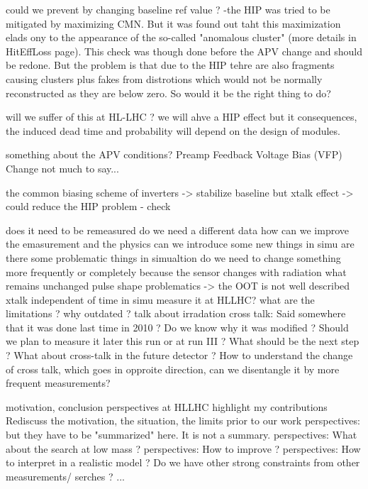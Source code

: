 could we prevent by changing baseline ref value ?
	-the HIP was tried to be mitigated by maximizing CMN. But it was found out taht this maximization elads ony to the appearance of the so-called "anomalous cluster" (more details in HitEffLoss page). This check was though done before the APV change and should be redone. But the problem is that due to the HIP tehre are also fragments causing clusters plus fakes from distrotions which would not be normally reconstructed as they are below zero. So would it be the right thing to do?  %

will we suffer of this at HL-LHC ?
we will ahve a HIP effect but it consequences, the induced dead time and probability will depend on the design of modules.

something about the APV conditions?
Preamp Feedback Voltage Bias (VFP) Change
not much to say...

the common biasing scheme of inverters -> stabilize baseline but xtalk effect -> could reduce the HIP problem - check 


does it need to be remeasured
do we need a different data
how can we improve the emasurement and the physics
can we introduce some new things in simu
are there some problematic things in simualtion
do we need to change something more frequently or completely because the sensor changes with radiation
what remains unchanged
pulse shape problematics -> the OOT is not well described
xtalk independent of time in simu
measure it at HLLHC?
what are the limitations ?
why outdated ? talk about irradation
cross talk: Said somewhere that it was done last time in 2010 ?
Do we know why it was modified ?
Should we plan to measure it later this run or at run III ?
What should be the next step ?
What about cross-talk in the future detector ?
How to understand the change of cross talk, which goes in opproite direction, can we disentangle it by more frequent measurements?


motivation, conclusion
perspectives at HLLHC
highlight my contributions
Rediscuss the motivation, the situation, the limits prior to our work
perspectives: but they have to be "summarized" here. It is not a summary.
perspectives:	What about the search at low mass ?
perspectives:	How to improve ?
perspectives:	How to interpret in a realistic model ? Do we have other strong constraints from other measurements/ serches ? ...
